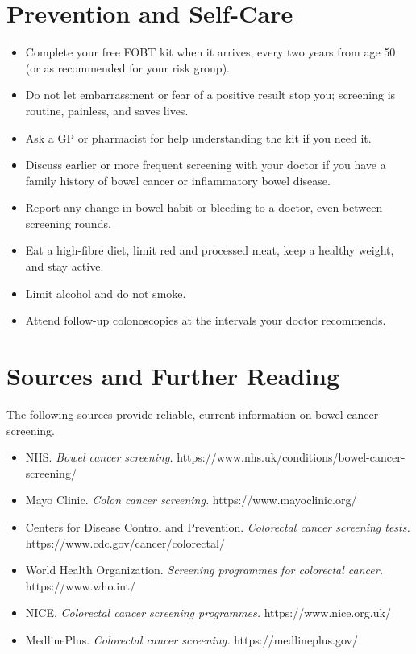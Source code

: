 \section*{Prevention and Self-Care}
\begin{itemize}
    \item Complete your free FOBT kit when it arrives, every two years from age 50 (or as recommended for your risk group).
    \item Do not let embarrassment or fear of a positive result stop you; screening is routine, painless, and saves lives.
    \item Ask a GP or pharmacist for help understanding the kit if you need it.
    \item Discuss earlier or more frequent screening with your doctor if you have a family history of bowel cancer or inflammatory bowel disease.
    \item Report any change in bowel habit or bleeding to a doctor, even between screening rounds.
    \item Eat a high-fibre diet, limit red and processed meat, keep a healthy weight, and stay active.
    \item Limit alcohol and do not smoke.
    \item Attend follow-up colonoscopies at the intervals your doctor recommends.
\end{itemize}

\section*{Sources and Further Reading}
The following sources provide reliable, current information on bowel cancer screening.
\begin{itemize}
    \item NHS. \textit{Bowel cancer screening.} https://www.nhs.uk/conditions/bowel-cancer-screening/
    \item Mayo Clinic. \textit{Colon cancer screening.} https://www.mayoclinic.org/
    \item Centers for Disease Control and Prevention. \textit{Colorectal cancer screening tests.} https://www.cdc.gov/cancer/colorectal/
    \item World Health Organization. \textit{Screening programmes for colorectal cancer.} https://www.who.int/
    \item NICE. \textit{Colorectal cancer screening programmes.} https://www.nice.org.uk/
    \item MedlinePlus. \textit{Colorectal cancer screening.} https://medlineplus.gov/
\end{itemize}
